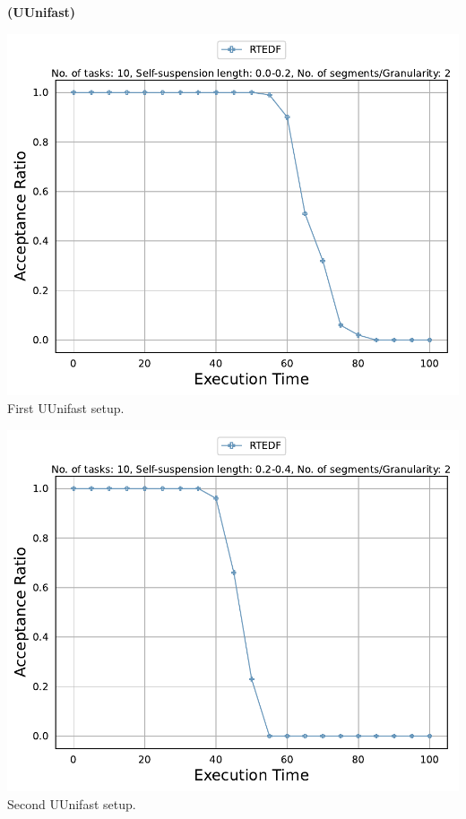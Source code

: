\documentclass[]{article}
\begin{document}
	\begin{minipage}[t]{0.48\linewidth}
		\centering
		\textbf{(UUnifast)}
		\vspace{0.3cm}
		
		\includegraphics[width=\linewidth]{RTEDF[2][0.0-0.2][10].pdf}
		First UUnifast setup.
		\vspace{0.3cm}
		
		\includegraphics[width=\linewidth]{RTEDF[2][0.2-0.4][10].pdf}
		Second UUnifast setup.
		\vspace{0.3cm}
		

\end{minipage}
\end{document}
